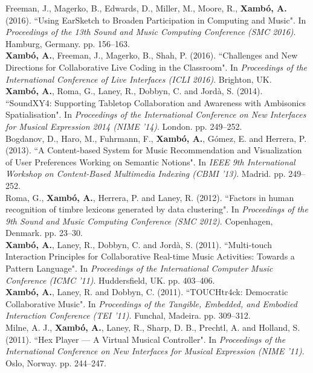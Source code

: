 \documentclass[10pt, a4paper]{article}
\newcommand{\years}[1]{\marginnote{\scriptsize #1}}
\begin{document}
\years{2016b}Freeman, J., Magerko, B., Edwards, D., Miller, M., Moore, R., \textbf{Xambó, A.} (2016). “Using EarSketch to Broaden Participation in Computing and Music". In \emph{Proceedings of the 13th Sound and Music Computing Conference (SMC 2016)}. Hamburg, Germany. pp. 156--163.\\
\years{2016a}\textbf{Xambó, A.}, Freeman, J., Magerko, B., Shah, P. (2016). “Challenges and New Directions for Collaborative Live Coding in the Classroom". In \emph{Proceedings of the International Conference of Live Interfaces (ICLI 2016)}. Brighton, UK.\\
\years{2014}\textbf{Xambó, A.}, Roma, G., Laney, R., Dobbyn, C. and Jordà, S. (2014). “SoundXY4: Supporting Tabletop Collaboration and Awareness with Ambisonics Spatialisation". In \emph{Proceedings of the International Conference on New Interfaces for Musical Expression 2014 (NIME '14)}. London. pp. 249--252.\\
\years{2013}Bogdanov, D., Haro, M., Fuhrmann, F., \textbf{Xambó, A.}, Gómez, E. and Herrera, P. (2013). “A Content-based System for Music Recommendation and Visualization of User Preferences Working on Semantic Notions". In \emph{IEEE 9th International Workshop on Content-Based Multimedia Indexing (CBMI '13)}. Madrid. pp. 249--252.\\
\years{2012}Roma, G., \textbf{Xambó, A.}, Herrera, P. and Laney, R. (2012). “Factors in human recognition of timbre lexicons generated by data clustering". In \emph{Proceedings of the 9th Sound and Music Computing Conference (SMC 2012)}. Copenhagen, Denmark. pp. 23--30.\\
\years{2011c}\textbf{Xambó, A.}, Laney, R., Dobbyn, C. and Jordà, S. (2011). “Multi-touch Interaction Principles for Collaborative Real-time Music Activities: Towards a Pattern Language". In \emph{Proceedings of the International Computer Music Conference (ICMC '11)}. Huddersfield, UK. pp. 403--406.\\
\years{2011b}\textbf{Xambó, A.}, Laney, R. and Dobbyn, C. (2011). “TOUCHtr4ck: Democratic Collaborative Music". In \emph{Proceedings of the Tangible, Embedded, and Embodied Interaction Conference (TEI '11)}. Funchal, Madeira. pp. 309--312.\\
\years{2011a}Milne, A. J., \textbf{Xambó, A.}, Laney, R., Sharp, D. B., Prechtl, A. and Holland, S. (2011). “Hex Player — A Virtual Musical Controller". In \emph{Proceedings of the International Conference on New Interfaces for Musical Expression (NIME '11)}. Oslo, Norway. pp. 244--247.\\
\end{document}
